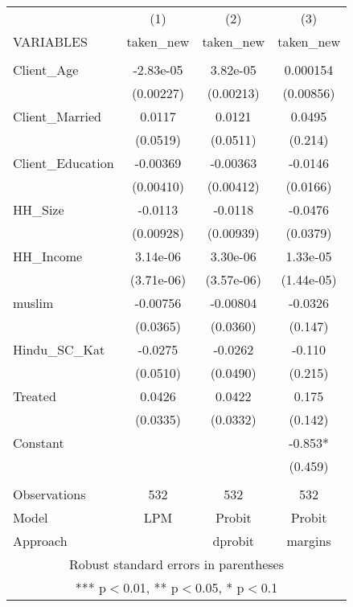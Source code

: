 \begin{tabular}{lccc} \hline
 & (1) & (2) & (3) \\
VARIABLES & taken\_new & taken\_new & taken\_new \\ \hline
 &  &  &  \\
Client\_Age & -2.83e-05 & 3.82e-05 & 0.000154 \\
 & (0.00227) & (0.00213) & (0.00856) \\
Client\_Married & 0.0117 & 0.0121 & 0.0495 \\
 & (0.0519) & (0.0511) & (0.214) \\
Client\_Education & -0.00369 & -0.00363 & -0.0146 \\
 & (0.00410) & (0.00412) & (0.0166) \\
HH\_Size & -0.0113 & -0.0118 & -0.0476 \\
 & (0.00928) & (0.00939) & (0.0379) \\
HH\_Income & 3.14e-06 & 3.30e-06 & 1.33e-05 \\
 & (3.71e-06) & (3.57e-06) & (1.44e-05) \\
muslim & -0.00756 & -0.00804 & -0.0326 \\
 & (0.0365) & (0.0360) & (0.147) \\
Hindu\_SC\_Kat & -0.0275 & -0.0262 & -0.110 \\
 & (0.0510) & (0.0490) & (0.215) \\
Treated & 0.0426 & 0.0422 & 0.175 \\
 & (0.0335) & (0.0332) & (0.142) \\
Constant &  &  & -0.853* \\
 &  &  & (0.459) \\
 &  &  &  \\
Observations & 532 & 532 & 532 \\
Model & LPM & Probit & Probit \\
 Approach &  & dprobit & margins \\ \hline
\multicolumn{4}{c}{ Robust standard errors in parentheses} \\
\multicolumn{4}{c}{ *** p$<$0.01, ** p$<$0.05, * p$<$0.1} \\
\end{tabular}
